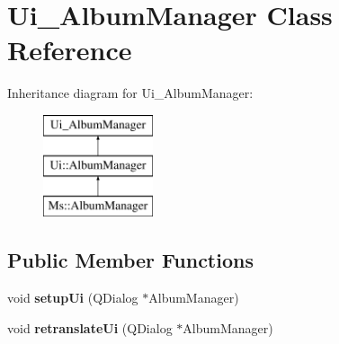 \hypertarget{class_ui___album_manager}{}\section{Ui\+\_\+\+Album\+Manager Class Reference}
\label{class_ui___album_manager}
Inheritance diagram for Ui\+\_\+\+Album\+Manager\+:\begin{figure}[H]
\begin{center}
\leavevmode
\includegraphics[height=3.000000cm]{class_ui___album_manager}
\end{center}
\end{figure}
\subsection*{Public Member Functions}
\begin{DoxyCompactItemize}
\item 
\mbox{\label{class_ui___album_manager_a40ad677a51331e887eccfcc48c5116e1}} 
void {\bfseries setup\+Ui} (Q\+Dialog $\ast$Album\+Manager)
\item 
\mbox{\label{class_ui___album_manager_acbfa56970566c0d1085d55bd84160ad4}} 
void {\bfseries retranslate\+Ui} (Q\+Dialog $\ast$Album\+Manager)
\end{DoxyCompactItemize}
